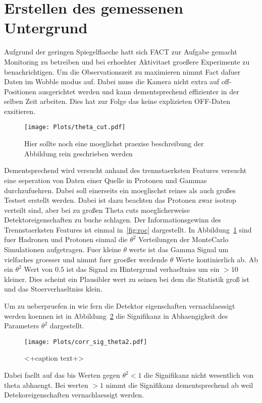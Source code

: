 \section{Erstellen des gemessenen Untergrund}
Aufgrund der geringen Spiegelflaeche hatt sich FACT zur Aufgabe gemacht Monitoring zu betreiben und bei erhoehter Aktivitaet groeßere Experimente zu benachrichtigen.
Um die Observationszeit zu maximieren nimmt Fact dafuer Daten im Wobble modus auf. 
Dabei muss die Kamera nicht extra auf off-Positionen ausgerichtet werden und kann dementsprechend effizienter in der selben Zeit arbeiten. 
Dies hat zur Folge das keine explizieten OFF-Daten exsitieren. 
\begin{figure}[H]
  \centering
  \texttt{[image: Plots/theta\_cut.pdf]}
  \caption{Hier sollte noch eine moeglichst praezise beschreibung der Abbildung rein geschrieben werden}
  \label{fig:thetacut}
\end{figure}
Dementsprechend wird versucht anhand des trennstaerksten Features versucht eine seperation von Daten einer Quelle in Protonen und Gammas durchzufuehren. 
Dabei soll einerseits ein moeglischst reines als auch großes Testset erstellt werden. 
Dabei ist dazu beachten das Protonen zwar isotrop verteilt sind, aber bei zu großen Theta cuts moeglicherweise Detektoreigenschaften zu buche schlagen. 
Der Informationsgewinn des Trennstaerksten Features ist einmal in~\ref{fig:roc} dargestellt. In Abbildung~\ref{fig:thetacut} sind fuer Hadronen und Protonen einmal die $\theta^{2}$ Verteilungen der MonteCarlo Simulationen aufgetragen. 
Fuer kleine $\theta$ werte ist das Gamma Signal um vielfaches groesser und nimmt fuer groeßer werdende $\theta$ Werte kontinierlich ab. 
Ab ein $\theta^{2}$ Wert von $0.5$ ist das Signal zu Hintergrund verhaeltniss um ein $>10$ kleiner. 
Dies scheint ein Plausibler wert zu seinen bei dem die Statistik groß ist und das Stoerverhaeltniss klein.

Um zu ueberpruefen in wie fern die Detektor eigenschaften vernachlaessigt werden koennen ist in Abbildung~\ref{fig:corrtheta} die Signifikanz in Abhaengigkeit des Parameters $\theta^{2}$ dargestellt.
\begin{figure}[H]
  \centering
  \texttt{[image: Plots/corr\_sig\_theta2.pdf]}
  \caption{<+caption text+>}
  \label{fig:corrtheta}
\end{figure}
Dabei faellt auf das bis Werten gegen $\theta^{2} < 1$ die Signifikanz nicht wesentlich von theta abhaengt. Bei werten $>1$ nimmt die Signifikanz dementsprechend ab weil Detekoreigenschaften vernachlaessigt werden.

